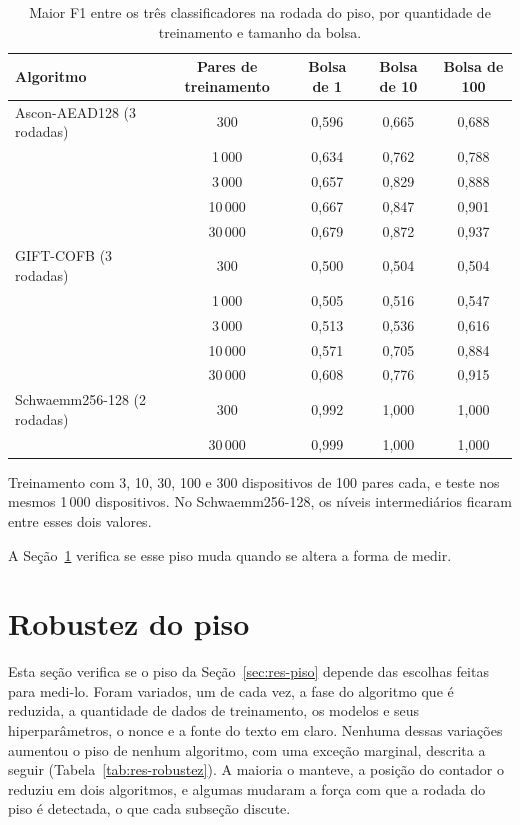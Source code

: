 \begin{table}[htb]
\centering
\caption{Maior F1 entre os três classificadores na rodada do piso, por quantidade de treinamento e tamanho da bolsa.}
\label{tab:res-dados-bolsa}
\footnotesize
\setlength{\tabcolsep}{4pt}
\begin{tabular}{lcccc}
\toprule
Algoritmo & Pares de treinamento & Bolsa de 1 & Bolsa de 10 & Bolsa de 100 \\
\midrule
Ascon-AEAD128 (3 rodadas)   & 300     & 0,596 & 0,665 & 0,688 \\
                            & 1\,000  & 0,634 & 0,762 & 0,788 \\
                            & 3\,000  & 0,657 & 0,829 & 0,888 \\
                            & 10\,000 & 0,667 & 0,847 & 0,901 \\
                            & 30\,000 & 0,679 & 0,872 & 0,937 \\
\midrule
GIFT-COFB (3 rodadas)       & 300     & 0,500 & 0,504 & 0,504 \\
                            & 1\,000  & 0,505 & 0,516 & 0,547 \\
                            & 3\,000  & 0,513 & 0,536 & 0,616 \\
                            & 10\,000 & 0,571 & 0,705 & 0,884 \\
                            & 30\,000 & 0,608 & 0,776 & 0,915 \\
\midrule
Schwaemm256-128 (2 rodadas) & 300     & 0,992 & 1,000 & 1,000 \\
                            & 30\,000 & 0,999 & 1,000 & 1,000 \\
\bottomrule
\end{tabular}
\par\smallskip\footnotesize Treinamento com 3, 10, 30, 100 e 300 dispositivos de 100 pares cada, e teste nos mesmos 1\,000 dispositivos. No Schwaemm256-128, os níveis intermediários ficaram entre esses dois valores.
\end{table}

A Seção~\ref{sec:res-robustez} verifica se esse piso muda quando se altera a forma de medir.


\section{Robustez do piso}
\label{sec:res-robustez}

Esta seção verifica se o piso da Seção~\ref{sec:res-piso} depende das escolhas feitas para medi-lo. Foram variados, um de cada vez, a fase do algoritmo que é reduzida, a quantidade de dados de treinamento, os modelos e seus hiperparâmetros, o nonce e a fonte do texto em claro. Nenhuma dessas variações aumentou o piso de nenhum algoritmo, com uma exceção marginal, descrita a seguir (Tabela~\ref{tab:res-robustez}). A maioria o manteve, a posição do contador o reduziu em dois algoritmos, e algumas mudaram a força com que a rodada do piso é detectada, o que cada subseção discute.

